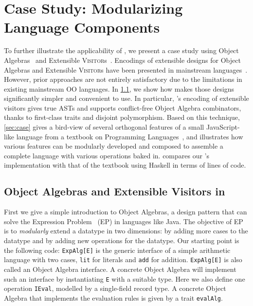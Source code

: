 \section{Case Study: Modularizing Language Components}
\label{sec:application}

To further illustrate the applicability of \name, we present a case
study using Object Algebras~\cite{oliveira2012extensibility} and
Extensible \textsc{Visitor}s~\cite{oliveira09modular, togersen:2004}. Encodings
of extensible designs for Object Algebras and Extensible \textsc{Visitor}s have
been presented in mainstream languages~\cite{oliveira09modular, togersen:2004, oliveira2012extensibility, oliveira2013feature, rendel14attributes}.
However, prior approaches are not entirely satisfactory
due to the limitations in existing mainstream OO languages. In \cref{sec:ob}, we show how \name makes those designs significantly simpler and
convenient to use. In particular, \name's encoding of extensible visitors gives true ASTs and supports
conflict-free Object Algebra combinators, thanks to first-class traits and disjoint polymorphism.
Based on this technique, \cref{sec:case} gives a bird-view of several orthogonal features of
a small JavaScript-like language from a textbook on Programming
Languages~\cite{poplcook}, and illustrates how various features can
be modularly developed and composed to assemble a complete language with various
operations baked in.  compares our \name's implementation
with that of the textbook using Haskell in terms of lines of code.


\subsection{Object Algebras and Extensible Visitors in \name}
\label{sec:ob}

First we give a simple introduction to Object Algebras, a design pattern that
can solve the Expression Problem~\cite{wadler1998expression} (EP) in languages like
Java. The objective of EP is to \emph{modularly} extend a datatype in two
dimensions: by adding more cases to the datatype and by adding new operations
for the datatype.
Our starting point is the following code:
\lstinline{ExpAlg[E]} is the generic interface of a simple arithmetic language
with two cases, \lstinline{lit} for literals and \lstinline{add} for addition.
\lstinline{ExpAlg[E]} is also called an Object Algebra interface. A concrete
Object Algebra will implement such an interface by instantiating \lstinline{E}
with a suitable type. Here we also define one operation \lstinline{IEval},
modelled by a single-field record type. A concrete Object Algebra that
implements the evaluation rules is given by a trait
\lstinline{evalAlg}.

